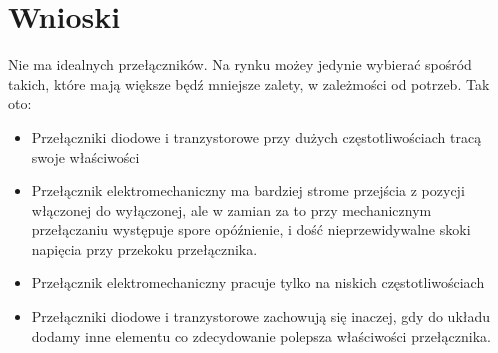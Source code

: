 \documentclass[a4paper,11pt]{article}
\begin{document}
\section{Wnioski}

Nie ma idealnych przełączników. Na rynku możey jedynie wybierać spośród takich, które mają większe będź mniejsze zalety, w zależmości od potrzeb. Tak oto: 
\begin{itemize}
  \item Przełączniki diodowe i tranzystorowe przy dużych częstotliwościach tracą swoje właściwości 
  \item Przełącznik elektromechaniczny ma bardziej strome przejścia z pozycji włączonej do wyłączonej, ale w zamian za to przy mechanicznym przełączaniu występuje spore  opóźnienie, i dość nieprzewidywalne skoki napięcia przy przekoku przełącznika. 
  \item Przełącznik elektromechaniczny pracuje tylko na niskich częstotliwościach 
  \item Przełączniki diodowe i tranzystorowe zachowują się inaczej, gdy do układu dodamy inne elementu co zdecydowanie polepsza właściwości przełącznika. 
\end{itemize}
\end{document}
